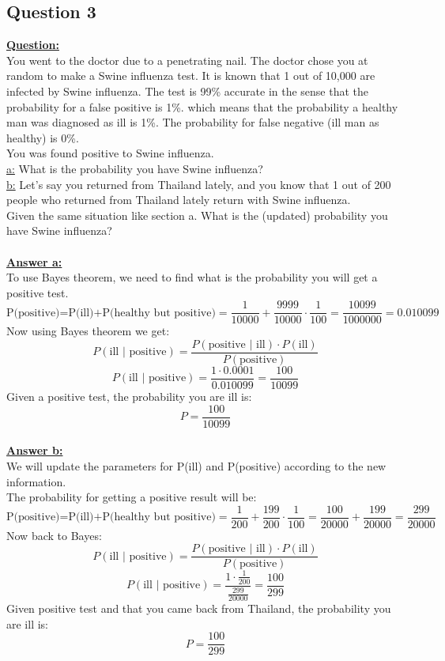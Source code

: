 \documentclass[a4, 12pt,titlepage]{scrartcl}
\begin{document}
\subsection{Question 3}
\textbf{\underline{Question:}}\\
You went to the doctor due to a penetrating nail. The doctor chose you at random to make a Swine influenza test. It is known that 1 out of 10,000 are infected by Swine influenza. The test is 99\% accurate in the sense that the probability for a false positive is 1\%. which means that the probability a healthy man was diagnosed as ill is 1\%. The probability for false negative (ill man as healthy) is 0\%.\\
You was found positive to Swine influenza.\\

\noindent
\underline{a:} What is the probability you have Swine influenza?\\
\underline{b:} Let's say you returned from Thailand lately, and you know that 1 out of 200 people who returned from Thailand lately return with Swine influenza.\\
Given the same situation like section a. What is the (updated) probability you have Swine influenza? \\
\smallskip\\

\noindent
\textbf{\underline{Answer a:}}\\
To use Bayes theorem, we need to find what is the probability you will get a positive test. \[
\textrm{P(positive)=P(ill)+P(healthy but positive)}=\frac{1}{10000}+\frac{9999}{10000}\cdot \frac{1}{100}=\frac{10099}{1000000}=0.010099
\]
Now using Bayes theorem we get:\[
P(\textrm{ill $|$ positive})=\frac{P(\textrm{positive $|$ ill})\cdot P(\textrm{ill})}{P(\textrm{positive})}
\]
\[
P(\textrm{ill $|$ positive})=\frac{1\cdot 0.0001}{0.010099}=\frac{100}{10099}
\]
Given a positive test, the probability you are ill is:\[
\boxed{P=\frac{100}{10099}}
\]
\smallskip\\
\textbf{\underline{Answer b:}}\\
We will update the parameters for P(ill) and P(positive) according to the new information.\\
The probability for getting a positive result will be:\[
\textrm{P(positive)=P(ill)+P(healthy but positive)}=\frac{1}{200}+\frac{199}{200}\cdot \frac{1}{100}=\frac{100}{20000}+\frac{199}{20000}=\frac{299}{20000}
\]
Now back to Bayes:\[
P(\textrm{ill $|$ positive})=\frac{P(\textrm{positive $|$ ill})\cdot P(\textrm{ill})}{P(\textrm{positive})}
\]
\[
P(\textrm{ill $|$ positive})=\frac{1\cdot \frac{1}{200}}{\frac{299}{20000}}=\frac{100}{299}
\]Given positive test and that you came back from Thailand, the probability you are ill is:\[
\boxed{P=\frac{100}{299}}
\]
\end{document}
